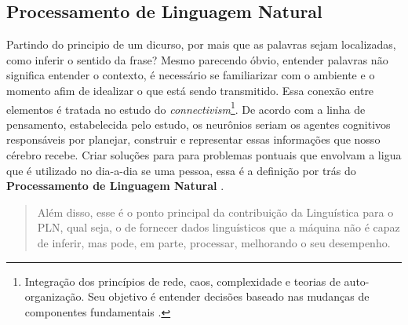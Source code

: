 \subsection{Processamento de Linguagem Natural}
Partindo do principio de um dicurso, por mais que as palavras sejam localizadas, como inferir o sentido da frase? Mesmo parecendo óbvio, entender palavras não significa entender o contexto, é necessário se familiarizar com o ambiente e o momento afim de idealizar o que está sendo transmitido. Essa conexão entre elementos é tratada no estudo do \textit{connectivism}\footnote{Integração dos princípios de rede, caos, complexidade e teorias de auto-organização. Seu objetivo é entender decisões baseado nas mudanças de componentes fundamentais \cite{siemens2014connectivism}.}. De acordo com a linha de pensamento, estabelecida pelo estudo, os neurônios seriam os agentes cognitivos responsáveis por planejar, construir e representar essas informações que nosso cérebro recebe. Criar soluções para para problemas pontuais que envolvam a ligua que é utilizado no dia-a-dia se uma pessoa, essa é a definição por trás do \textbf{Processamento de Linguagem Natural} \cite{brandura1996, maria2015npl}.

\begin{quote}
Além disso, esse é o ponto principal da contribuição da Linguística para o PLN, qual seja, o de fornecer dados linguísticos que a máquina não é capaz de inferir, mas pode, em parte, processar, melhorando o seu desempenho.
\end{quote}
